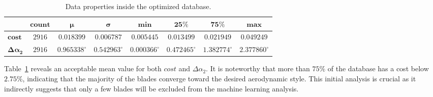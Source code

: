 \begin{table}[H]  
    \centering
    \renewcommand{\arraystretch}{2}
    \caption{Data properties inside the optimized database.}
    \label{tab:database}
    \begin{tabular}{| l c c c c c c c |}
        \hline
                                       & $\boldsymbol{count}$ & $\boldsymbol{\mu}$ & $\boldsymbol{\sigma}$ & $\boldsymbol{min}$ & $\boldsymbol{25\%}$ & $\boldsymbol{75\%}$ & $\boldsymbol{max}$ \\ \hline\hline
        $\boldsymbol{cost}$            & $2916$               & $0.018399$         & $0.006787$            & $0.005445$         & $0.013499$          & $0.021949$          & $0.049249$         \\ \hline
        $\boldsymbol{\Delta \alpha_2}$ & $2916$               & $0.965338^\circ$   & $0.542963^\circ$      & $0.000366^\circ$   & $0.472465^\circ$    & $1.382774^\circ$    & $2.377860^\circ$   \\ \hline
    \end{tabular}
\end{table}




Table~\ref{tab:database} reveals an acceptable mean value for both $cost$ and $\Delta \alpha_2$. It is noteworthy that more than $75\%$ of the database has a cost below $2.75\%$, indicating that the majority of the blades converge toward the desired aerodynamic style. 
This initial analysis is crucial as it indirectly suggests that only a few blades will be excluded from the machine learning analysis.

